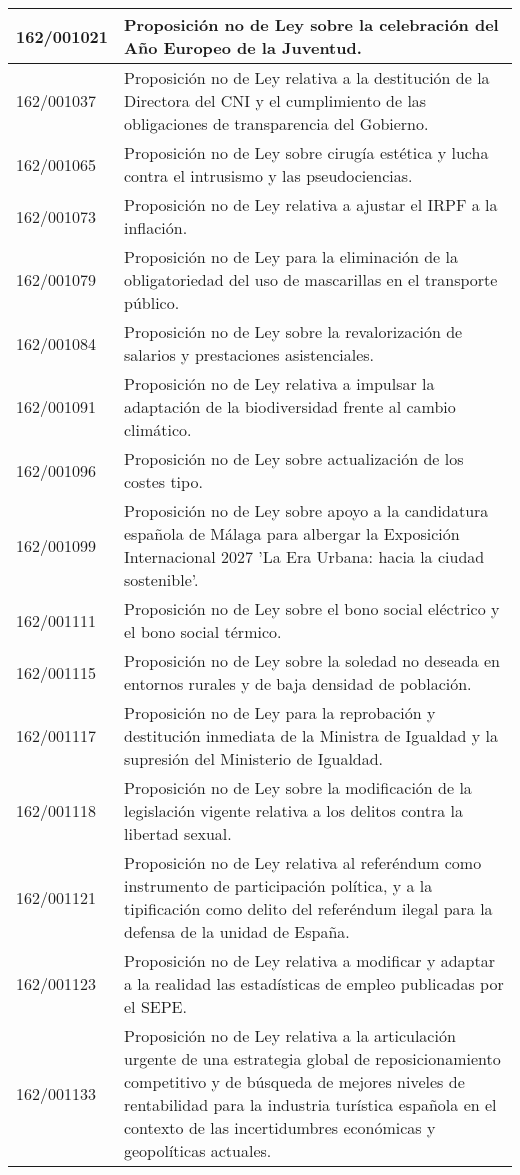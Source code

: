 {\begin{table}[H]
\begin{center}
\begin{tabularx}{\linewidth}{| l | X |}
\hline
162/001021 & Proposición no de Ley sobre la celebración del Año Europeo de la Juventud. \\
\hline
162/001037 & Proposición no de Ley relativa a la destitución de la Directora del CNI y el cumplimiento de las obligaciones de transparencia del Gobierno. \\
\hline
162/001065 & Proposición no de Ley sobre cirugía estética y lucha contra el intrusismo y las pseudociencias. \\
\hline
162/001073 & Proposición no de Ley relativa a ajustar el IRPF a la inflación. \\
\hline
162/001079 & Proposición no de Ley para la eliminación de la obligatoriedad del uso de mascarillas en el transporte público. \\
\hline
162/001084 & Proposición no de Ley sobre la revalorización de salarios y prestaciones asistenciales. \\
\hline
162/001091 & Proposición no de Ley relativa a impulsar la adaptación de la biodiversidad frente al cambio climático. \\
\hline
162/001096 & Proposición no de Ley sobre actualización de los costes tipo. \\
\hline
162/001099 & Proposición no de Ley sobre apoyo a la candidatura española de Málaga para albergar la Exposición Internacional 2027 'La Era Urbana: hacia la ciudad sostenible'. \\
\hline
162/001111 & Proposición no de Ley sobre el bono social eléctrico y el bono social térmico. \\
\hline
162/001115 & Proposición no de Ley sobre la soledad no deseada en entornos rurales y de baja densidad de población. \\
\hline
162/001117 & Proposición no de Ley para la reprobación y destitución inmediata de la Ministra de Igualdad y la supresión del Ministerio de Igualdad. \\
\hline
162/001118 & Proposición no de Ley sobre la modificación de la legislación vigente relativa a los delitos contra la libertad sexual. \\
\hline
162/001121 & Proposición no de Ley relativa al referéndum como instrumento de participación política, y a la tipificación como delito del referéndum ilegal para la defensa de la unidad de España. \\
\hline
162/001123 & Proposición no de Ley relativa a modificar y adaptar a la realidad las estadísticas de empleo publicadas por el SEPE. \\
\hline
162/001133 & Proposición no de Ley relativa a la articulación urgente de una estrategia global de reposicionamiento competitivo y de búsqueda de mejores niveles de rentabilidad para la industria turística española en el contexto de las incertidumbres económicas y geopolíticas actuales. \\

\end{tabularx}
\end{center}
\end{table}}
